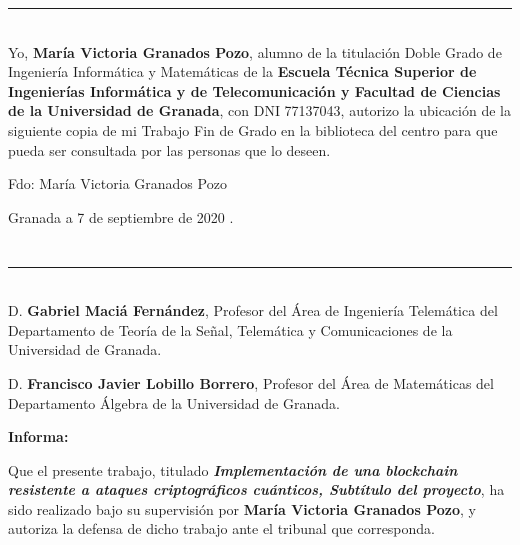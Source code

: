 \noindent\rule[-1ex]{\textwidth}{2pt}\\[4.5ex]

Yo, \textbf{María Victoria Granados Pozo}, alumno de la titulación Doble Grado de Ingeniería Informática y Matemáticas de la \textbf{Escuela Técnica Superior
de Ingenierías Informática y de Telecomunicación y Facultad de Ciencias de la Universidad de Granada}, con DNI 77137043, autorizo la
ubicación de la siguiente copia de mi Trabajo Fin de Grado en la biblioteca del centro para que pueda ser
consultada por las personas que lo deseen.

\vspace{6cm}

\noindent Fdo: María Victoria Granados Pozo

\vspace{2cm}

\begin{flushright}
Granada a 7 de septiembre de 2020 .
\end{flushright}


\chapter*{}
\thispagestyle{empty}

\noindent\rule[-1ex]{\textwidth}{2pt}\\[4.5ex]

D. \textbf{Gabriel Maciá Fernández}, Profesor del Área de Ingeniería Telemática del Departamento de Teoría de la Señal, Telemática y Comunicaciones de la Universidad de Granada.

\vspace{0.5cm}

D. \textbf{Francisco Javier Lobillo Borrero}, Profesor del Área de Matemáticas del Departamento Álgebra de la Universidad de Granada.


\vspace{0.5cm}

\textbf{Informa:}

\vspace{0.5cm}

Que el presente trabajo, titulado \textit{\textbf{ Implementación de una blockchain resistente a ataques criptográficos cuánticos, Subtítulo del proyecto}},
ha sido realizado bajo su supervisión por \textbf{María Victoria Granados Pozo}, y autoriza la defensa de dicho trabajo ante el tribunal
que corresponda.

\vspace{0.5cm}

